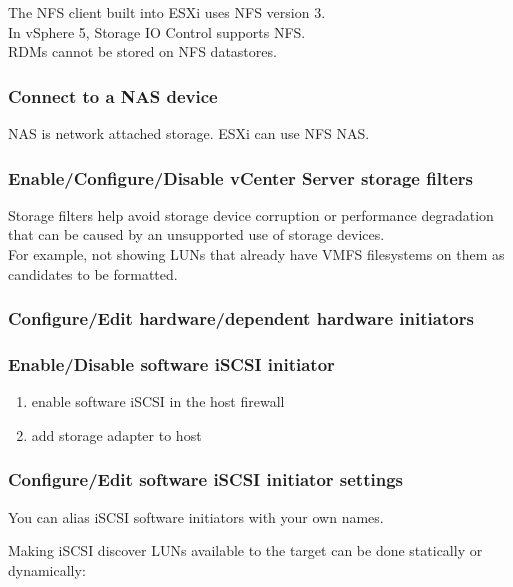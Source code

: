 The NFS client built into ESXi uses NFS version 3.\\

In vSphere 5, Storage IO Control supports NFS.\\

RDMs cannot be stored on NFS datastores.\\

\subsubsection{Connect to a NAS device}

NAS is network attached storage. ESXi can use NFS NAS.

\subsubsection{Enable/Configure/Disable vCenter Server storage filters}

Storage filters help avoid storage device corruption or performance
degradation that can be caused by an unsupported use of storage devices.\\

For example, not showing LUNs that already have VMFS filesystems on them
as candidates to be formatted.

\subsubsection{Configure/Edit hardware/dependent hardware initiators}

\subsubsection{Enable/Disable software iSCSI initiator}

\begin{enumerate}
\item enable software iSCSI in the host firewall
\item add storage adapter to host
\end{enumerate}

\subsubsection{Configure/Edit software iSCSI initiator settings}

You can alias iSCSI software initiators with your own names.

Making iSCSI discover LUNs available to the target can be done statically
or dynamically:

